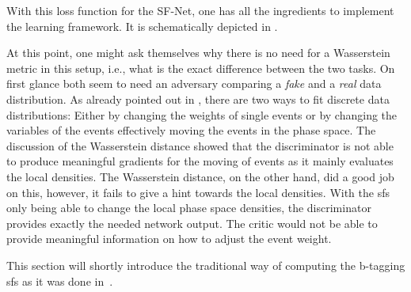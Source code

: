 With this loss function for the SF-Net, one has all the ingredients to implement the learning framework. It is schematically depicted in .

At this point, one might ask themselves why there is no need for a Wasserstein metric in this setup, i.e., what is the exact difference between the two tasks. On first glance both seem to need an adversary comparing a \emph{fake} and a \emph{real} data distribution. As already pointed out in , there are two ways to fit discrete data distributions: Either by changing the weights of single events or by changing the variables of the events effectively moving the events in the phase space. The discussion of the Wasserstein distance showed that the discriminator is not able to produce meaningful gradients for the moving of events as it mainly evaluates the local densities. The Wasserstein distance, on the other hand, did a good job on this, however, it fails to give a hint towards the local densities. With the \glspl{sf} only being able to change the local phase space densities, the discriminator provides exactly the needed network output. The critic would not be able to provide meaningful information on how to adjust the event weight.

\label{ssec:tradsf}

This section will shortly introduce the traditional way of computing the b-tagging \glspl{sf} as it was done in~\cite{sf-an}.

